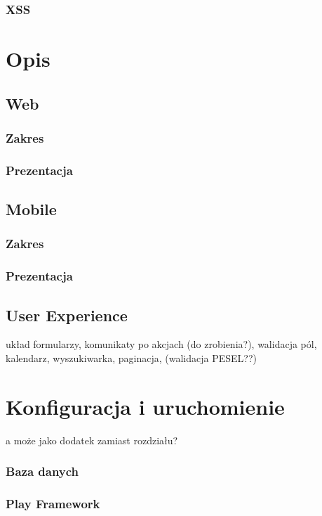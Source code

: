 \documentclass[11pt]{aghdpl}
\begin{document}
\subsection{XSS}



\chapter{Opis}
\label{cha:opis}

\section{Web}
\subsection{Zakres}
\subsection{Prezentacja}
\section{Mobile}
\subsection{Zakres}
\subsection{Prezentacja}
\section{User Experience}
układ formularzy, komunikaty po akcjach (do zrobienia?), walidacja pól, kalendarz, wyszukiwarka, paginacja, (walidacja PESEL??)

\chapter{Konfiguracja i uruchomienie}
\label{cha:konfiguracja_i_uruchomienie}
a może jako dodatek zamiast rozdziału?

\subsection{Baza danych}
\subsection{Play Framework}
\end{document}
